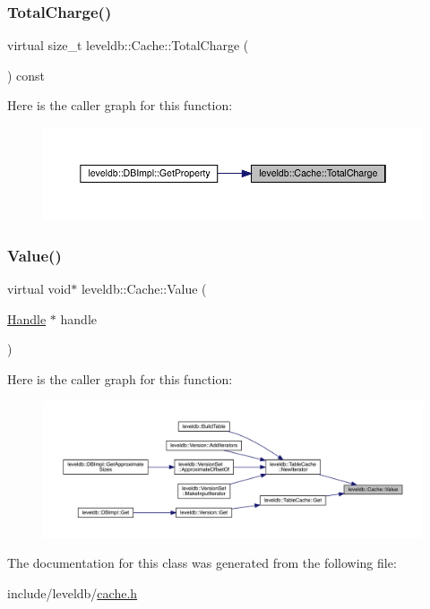 \subsubsection{\texorpdfstring{TotalCharge()}{TotalCharge()}}
{\footnotesize\ttfamily virtual size\+\_\+t leveldb\+::\+Cache\+::\+Total\+Charge (\begin{DoxyParamCaption}{ }\end{DoxyParamCaption}) const\hspace{0.3cm}{\ttfamily [pure virtual]}}

Here is the caller graph for this function\+:
\nopagebreak
\begin{figure}[H]
\begin{center}
\leavevmode
\includegraphics[width=350pt]{classleveldb_1_1_cache_a4ccef9422e919a7e5a1ffb64443f88ef_icgraph}
\end{center}
\end{figure}
\mbox{\label{classleveldb_1_1_cache_a454920df8e68917adcf011dfb3538661}} 
\subsubsection{\texorpdfstring{Value()}{Value()}}
{\footnotesize\ttfamily virtual void$\ast$ leveldb\+::\+Cache\+::\+Value (\begin{DoxyParamCaption}\item[{\mbox{\hyperlink{structleveldb_1_1_cache_1_1_handle}{Handle}} $\ast$}]{handle }\end{DoxyParamCaption})\hspace{0.3cm}{\ttfamily [pure virtual]}}

Here is the caller graph for this function\+:
\nopagebreak
\begin{figure}[H]
\begin{center}
\leavevmode
\includegraphics[width=350pt]{classleveldb_1_1_cache_a454920df8e68917adcf011dfb3538661_icgraph}
\end{center}
\end{figure}


The documentation for this class was generated from the following file\+:\begin{DoxyCompactItemize}
\item 
include/leveldb/\mbox{\hyperlink{cache_8h}{cache.\+h}}\end{DoxyCompactItemize}
